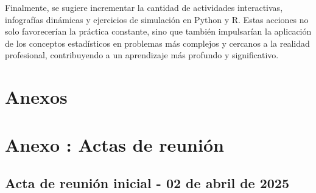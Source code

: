 \documentclass[letter,oneside,12pt,spanish]{report}
\begin{document}
Finalmente, se sugiere incrementar la cantidad de actividades interactivas, infografías dinámicas y ejercicios de simulación en Python y R. Estas acciones no solo favorecerían la práctica constante, sino que también impulsarían la aplicación de los conceptos estadísticos en problemas más complejos y cercanos a la realidad profesional, contribuyendo a un aprendizaje más profundo y significativo.

\newpage

%
%

\printbibliography

\nocite{poniszewska-maranda, burns-kubernetes, torres-bosch-microservicios, armstrong2015,kubevirtio, docker2023, kubelet-doc, namespace-article}
\newpage

\bgroup
\bgroup
\makeatletter
\@openrightfalse
\appendix

\chapter*{Anexos}

\chapter*{Anexo \thechapter: Actas de reunión}
\label{anexo:actas}

\section*{Acta de reunión inicial - 02 de abril de 2025}
\label{anexo:acta-abril-2025}
\end{document}
